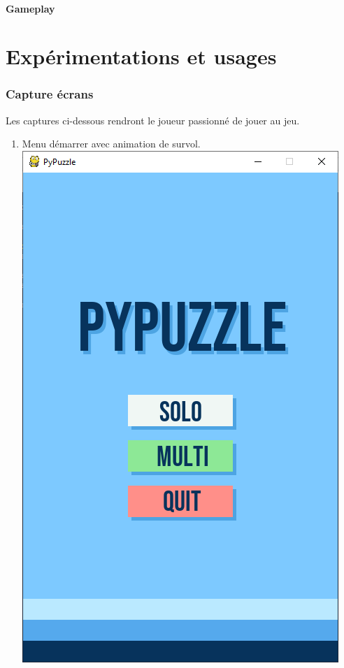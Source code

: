 \documentclass[a4paper]{report}
\begin{document}
\subsection{Gameplay}


\part{Expérimentations et usages}
\section{Capture écrans}
Les captures ci-dessous rendront le joueur passionné de jouer au jeu.
\begin{enumerate}
    \item Menu démarrer avec animation de survol.\\
        \includegraphics[scale=0.3]{images/1-menu.png}

\end{enumerate}
\end{document}
